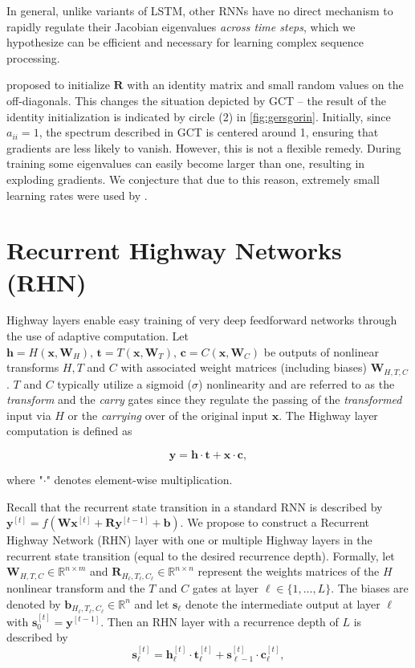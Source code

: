 \documentclass[letterpaper]{article}
\newcommand{\ts}[1]{^{[#1]}}
\def\gct{GCT}
\def\Rmat{\mathbf{R}}
\def\Wmat{\mathbf{W}}
\def\xvec{\mathbf{x}}
\def\yvec{\mathbf{y}}
\def\Svec{\mathbf{s}}
\def\Hvec{\mathbf{h}}
\def\Tvec{\mathbf{t}}
\def\Cvec{\mathbf{c}}
\def\srnn{standard RNN}
\def\Arch{Recurrent Highway Network} \def\arch{RHN}
\begin{document}
In general, unlike variants of LSTM, other RNNs have no direct mechanism to rapidly regulate their Jacobian eigenvalues \emph{across time steps}, which we hypothesize can be efficient and necessary for learning complex sequence processing.

\citet{identity_rnn} proposed to initialize $\Rmat$ with an identity matrix and small random values on the off-diagonals.
This changes the situation depicted by \gct{} -- the result of the identity initialization is indicated by circle (2) in \autoref{fig:gersgorin}.
Initially, since $a_{ii}=1$, the spectrum described in \gct{} is centered around 1, ensuring that gradients are less likely to vanish.
However, this is not a flexible remedy.
During training some eigenvalues can easily become larger than one, resulting in exploding gradients.
We conjecture that due to this reason, extremely small learning rates were used by \citet{identity_rnn}.

\section{\Arch{}s (\arch{})}\label{sec:highway_rnn}
Highway layers \citep{highways} enable easy training of very deep feedforward networks through the use of adaptive computation.
Let $\Hvec = H(\xvec,\Wmat_H), \, \Tvec = T(\xvec, \Wmat_T), \, \Cvec = C(\xvec, \Wmat_C)$ be outputs of nonlinear transforms $H, T$ and $C$ with associated weight matrices (including biases) $\Wmat_{H,T,C}$.
$T$ and $C$ typically utilize a sigmoid ($\sigma$) nonlinearity and are referred to as the \textit{transform} and the \textit{carry} gates since they regulate the passing of the \textit{transformed} input via $H$ or the \textit{carrying} over of the original input $\xvec$.
The Highway layer computation is defined as

\begin{equation}\label{eq:2}
\yvec =\mathbf{h} \cdot \mathbf{t} + \xvec\cdot\mathbf{c},
\end{equation}

where "$ \cdot$" denotes element-wise multiplication.

Recall that the recurrent state transition in a \srnn{} is described by $\yvec\ts{t} = f(\Wmat\xvec\ts{t}+\Rmat\yvec\ts{t-1} + \mathbf{b})$.
We propose to construct a \Arch{} (\arch{}) layer  with one or multiple Highway layers in the recurrent state transition (equal to the desired recurrence depth). 
Formally, let $\Wmat_{H,T,C} \in \mathbb{R}^{n \times m}$ and $\Rmat_{H_\ell,T_\ell,C_\ell} \in \mathbb{R}^{n \times n}$ represent the weights matrices of the $H$ nonlinear transform and the $T$ and $C$ gates at layer $ \ell \in \{1, \dots, L\}$.
The biases are denoted by $\mathbf{b}_{H_\ell,T_\ell,C_\ell} \in \mathbb{R}^n$ and let $\Svec_\ell$ denote the intermediate output at layer $\ell$ with $\Svec_0\ts{t} = \yvec\ts{t-1}$.
Then an \arch{} layer with a recurrence depth of $L$ is described by
\begin{equation}\Svec_\ell\ts{t} = \mathbf{h}_\ell\ts{t} \cdot \mathbf{t}_\ell\ts{t} + \Svec_{\ell-1}\ts{t} \cdot \mathbf{c}_\ell \ts{t},
\end{equation}
\end{document}

